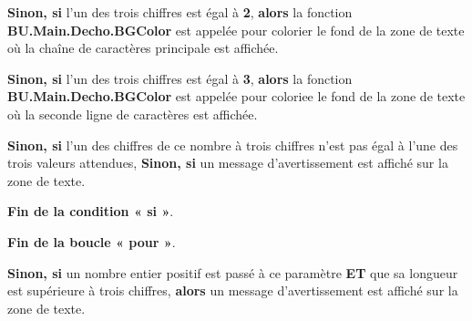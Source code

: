 \documentclass[a4paper,10pt]{article}
\begin{document}
\begin{itemize}
{\begin{justify}
{\begin{itemize}
{                            \begin{justify}
                                \textbf{\color{cond}Sinon, si} l'un des trois chiffres est égal à \textbf{2}, \textbf{\color{cond}alors} la fonction \textbf{\color{func}BU.Main.Decho.BGColor} est appelée pour colorier le fond de la zone de texte où la chaîne de caractères principale est affichée.
                            \end{justify}\setlength{\parskip}{1em}

                            \begin{justify}
                                \textbf{\color{cond}Sinon, si} l'un des trois chiffres est égal à \textbf{3}, \textbf{\color{cond}alors} la fonction \textbf{\color{func}BU.Main.Decho.BGColor} est appelée pour coloriee le fond de la zone de texte où la seconde ligne de caractères est affichée.
                            \end{justify}\setlength{\parskip}{1em}

                            \begin{justify}
                                \textbf{\color{cond}Sinon, si} l'un des chiffres de ce nombre à trois chiffres n'est pas égal à l'une des trois valeurs attendues, \textbf{\color{cond}Sinon, si} un message d'avertissement est affiché sur la zone de texte.
                            \end{justify}\setlength{\parskip}{1em}

                            \begin{justify}
                                \textbf{\color{cond}Fin de la condition « si »}.
                            \end{justify}
                        }
                    \end{itemize}

                    \begin{justify}
                        \textbf{\color{loop}Fin de la boucle « pour »}.\\\mbox{}
                    \end{justify}
                }
            \end{justify}

            \item
            {
                \begin{justify}
                    \textbf{\color{cond}Sinon, si} un nombre entier positif est passé à ce paramètre \textbf{ET} que sa longueur est supérieure à trois chiffres, \textbf{\color{cond}alors} un message d'avertissement est affiché sur la zone de texte.
                \end{justify}

}}
\end{itemize}
\end{document}
